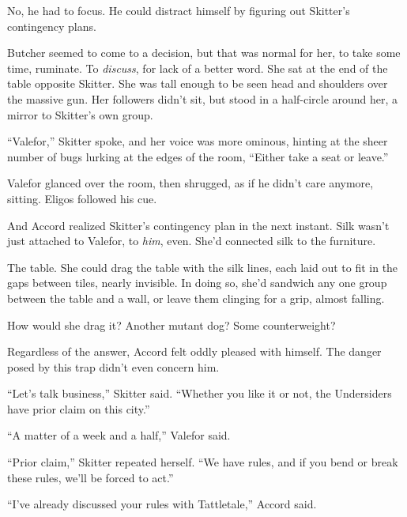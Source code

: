 No, he had to focus.  He could distract himself by figuring out Skitter's contingency plans.



Butcher seemed to come to a decision, but that was normal for her, to take some time, ruminate.  To \emph{discuss}, for lack of a better word.  She sat at the end of the table opposite Skitter.  She was tall enough to be seen head and shoulders over the massive gun.  Her followers didn't sit, but stood in a half-circle around her, a mirror to Skitter's own group.



``Valefor,'' Skitter spoke, and her voice was more ominous, hinting at the sheer number of bugs lurking at the edges of the room, ``Either take a seat or leave.''



Valefor glanced over the room, then shrugged, as if he didn't care anymore, sitting.  Eligos followed his cue.



And Accord realized Skitter's contingency plan in the next instant.  Silk wasn't just attached to Valefor, to \emph{him}, even.  She'd connected silk to the furniture.



The table.  She could drag the table with the silk lines, each laid out to fit in the gaps between tiles, nearly invisible.  In doing so, she'd sandwich any one group between the table and a wall, or leave them clinging for a grip, almost falling.



How would she drag it?  Another mutant dog?  Some counterweight?



Regardless of the answer, Accord felt oddly pleased with himself.  The danger posed by this trap didn't even concern him.



``Let's talk business,'' Skitter said.  ``Whether you like it or not, the Undersiders have prior claim on this city.''



``A matter of a week and a half,'' Valefor said.



``Prior claim,'' Skitter repeated herself.  ``We have rules, and if you bend or break these rules, we'll be forced to act.''



``I've already discussed your rules with Tattletale,'' Accord said.



